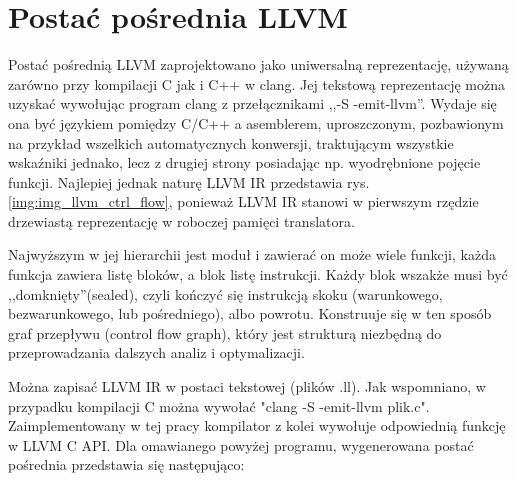 \section{Postać pośrednia LLVM}
Postać pośrednią LLVM zaprojektowano jako uniwersalną reprezentację, używaną zarówno przy kompilacji C jak i C++ w clang. Jej tekstową reprezentację można uzyskać wywołując program clang z przełącznikami ,,-S -emit-llvm''. Wydaje się ona być językiem pomiędzy C/C++ a asemblerem, uproszczonym, pozbawionym na przykład wszelkich automatycznych konwersji, traktującym wszystkie wskaźniki jednako, lecz z drugiej strony posiadając np. wyodrębnione pojęcie funkcji. Najlepiej jednak naturę LLVM IR przedstawia rys.\ref{img:img_llvm_ctrl_flow}, ponieważ LLVM IR stanowi w pierwszym rzędzie drzewiastą reprezentację w roboczej pamięci translatora.

Najwyższym w jej hierarchii jest moduł i zawierać on może wiele funkcji, każda funkcja zawiera listę bloków, a blok listę instrukcji. Każdy blok wszakże musi być ,,domknięty''(sealed), czyli kończyć się instrukcją skoku (warunkowego, bezwarunkowego, lub pośredniego), albo powrotu. Konstruuje się w ten sposób graf przepływu (control flow graph), który jest strukturą niezbędną do przeprowadzania dalszych analiz i optymalizacji.\cite{llvm_lang_ref}

Można zapisać LLVM IR w postaci tekstowej (plików .ll). Jak wspomniano, w przypadku kompilacji C można wywołać "clang -S -emit-llvm plik.c". Zaimplementowany w tej pracy kompilator z kolei wywołuje odpowiednią funkcję w LLVM C API. Dla omawianego powyżej programu, wygenerowana postać pośrednia przedstawia się następująco:

